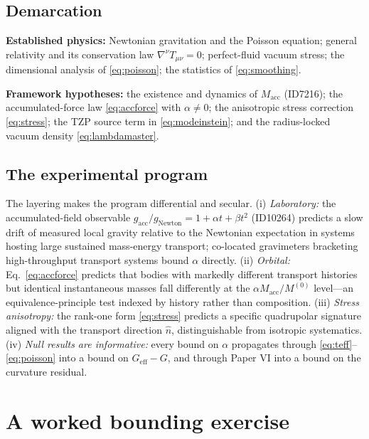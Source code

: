 \documentclass[11pt]{article}
\theoremstyle{remark}
\begin{document}
\subsection{Demarcation}

\textbf{Established physics:} Newtonian gravitation and the Poisson equation; general relativity and its conservation law $\nabla^\nu T_{\mu\nu} = 0$; perfect-fluid vacuum stress; the dimensional analysis of \eqref{eq:poisson}; the statistics of \eqref{eq:smoothing}.

\textbf{Framework hypotheses:} the existence and dynamics of $M_{\mathrm{acc}}$ (ID7216); the accumulated-force law \eqref{eq:accforce} with $\alpha \neq 0$; the anisotropic stress correction \eqref{eq:stress}; the TZP source term in \eqref{eq:modeinstein}; and the radius-locked vacuum density \eqref{eq:lambdamaster}.

\subsection{The experimental program}

The layering makes the program differential and secular. (i) \emph{Laboratory:} the accumulated-field observable $g_{\mathrm{acc}}/g_{\mathrm{Newton}} = 1 + \alpha t + \beta t^2$ (ID10264) predicts a slow drift of measured local gravity relative to the Newtonian expectation in systems hosting large sustained mass-energy transport; co-located gravimeters bracketing high-throughput transport systems bound $\alpha$ directly. (ii) \emph{Orbital:} Eq.~\eqref{eq:accforce} predicts that bodies with markedly different transport histories but identical instantaneous masses fall differently at the $\alpha M_{\mathrm{acc}}/M^{(0)}$ level---an equivalence-principle test indexed by history rather than composition. (iii) \emph{Stress anisotropy:} the rank-one form \eqref{eq:stress} predicts a specific quadrupolar signature aligned with the transport direction $\hat{n}$, distinguishable from isotropic systematics. (iv) \emph{Null results are informative:} every bound on $\alpha$ propagates through \eqref{eq:teff}--\eqref{eq:poisson} into a bound on $G_{\mathrm{eff}} - G$, and through Paper VI into a bound on the curvature residual.

\section{A worked bounding exercise}
\label{sec:worked}
\end{document}
